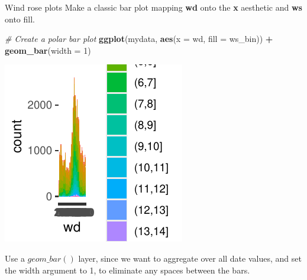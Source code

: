 \documentclass[
  ignorenonframetext,
]{beamer}
\newenvironment{Shaded}{\begin{snugshade}}{\end{snugshade}}
\newcommand{\AttributeTok}[1]{\textcolor[rgb]{0.13,0.29,0.53}{#1}}
\newcommand{\CommentTok}[1]{\textcolor[rgb]{0.56,0.35,0.01}{\textit{#1}}}
\newcommand{\DecValTok}[1]{\textcolor[rgb]{0.00,0.00,0.81}{#1}}
\newcommand{\FunctionTok}[1]{\textcolor[rgb]{0.13,0.29,0.53}{\textbf{#1}}}
\newcommand{\NormalTok}[1]{#1}
\newcommand{\SpecialCharTok}[1]{\textcolor[rgb]{0.81,0.36,0.00}{\textbf{#1}}}
\begin{document}
\begin{frame}[fragile]{Wind rose plots}
\label{wind-rose-plots-2}
Make a classic bar plot mapping \textbf{wd} onto the \textbf{x}
aesthetic and \textbf{ws} onto fill.


\begin{Shaded}
\begin{Highlighting}[]
\CommentTok{\# Create a polar bar plot}
\FunctionTok{ggplot}\NormalTok{(mydata, }\FunctionTok{aes}\NormalTok{(}\AttributeTok{x =}\NormalTok{ wd, }\AttributeTok{fill =}\NormalTok{ ws\_bin)) }\SpecialCharTok{+} \FunctionTok{geom\_bar}\NormalTok{(}\AttributeTok{width =} \DecValTok{1}\NormalTok{)}
\end{Highlighting}
\end{Shaded}

\begin{center}\includegraphics[width=0.5\linewidth]{Figs/unnamed-chunk-69-1} \end{center}

Use a \(geom\_bar()\) layer, since we want to aggregate over all date
values, and set the width argument to 1, to eliminate any spaces between
the bars.
\end{frame}
\end{document}
